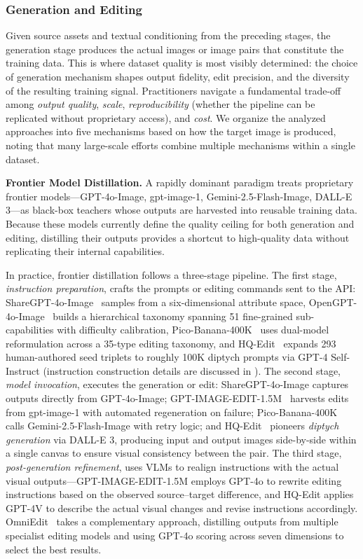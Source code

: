 \documentclass{llmxive}
\begin{document}
\subsubsection{Generation and Editing}
\label{sec:generation}

Given source assets and textual conditioning from the preceding stages, the generation stage produces the actual images or image pairs that constitute the training data. This is where dataset quality is most visibly determined: the choice of generation mechanism shapes output fidelity, edit precision, and the diversity of the resulting training signal. Practitioners navigate a fundamental trade-off among \emph{output quality}, \emph{scale}, \emph{reproducibility} (whether the pipeline can be replicated without proprietary access), and \emph{cost}. We organize the analyzed approaches into five mechanisms based on how the target image is produced, noting that many large-scale efforts combine multiple mechanisms within a single dataset.


\textbf{Frontier Model Distillation.}
A rapidly dominant paradigm treats proprietary frontier models---GPT-4o-Image, gpt-image-1, Gemini-2.5-Flash-Image, DALL-E 3---as black-box teachers whose outputs are harvested into reusable training data. Because these models currently define the quality ceiling for both generation and editing, distilling their outputs provides a shortcut to high-quality data without replicating their internal capabilities.

In practice, frontier distillation follows a three-stage pipeline. The first stage, \emph{instruction preparation}, crafts the prompts or editing commands sent to the API: ShareGPT-4o-Image~\citep{chen2025sharegpt} samples from a six-dimensional attribute space, OpenGPT-4o-Image~\citep{chen2025opengpt} builds a hierarchical taxonomy spanning 51 fine-grained sub-capabilities with difficulty calibration, Pico-Banana-400K~\citep{qian2025pico} uses dual-model reformulation across a 35-type editing taxonomy, and HQ-Edit~\citep{hui2024hq} expands 293 human-authored seed triplets to roughly 100K diptych prompts via GPT-4 Self-Instruct (instruction construction details are discussed in ). The second stage, \emph{model invocation}, executes the generation or edit: ShareGPT-4o-Image captures outputs directly from GPT-4o-Image; GPT-IMAGE-EDIT-1.5M~\citep{wang2025gpt} harvests edits from gpt-image-1 with automated regeneration on failure; Pico-Banana-400K calls Gemini-2.5-Flash-Image with retry logic; and HQ-Edit~\citep{hui2024hq} pioneers \emph{diptych generation} via DALL-E 3, producing input and output images side-by-side within a single canvas to ensure visual consistency between the pair. The third stage, \emph{post-generation refinement}, uses VLMs to realign instructions with the actual visual outputs---GPT-IMAGE-EDIT-1.5M employs GPT-4o to rewrite editing instructions based on the observed source--target difference, and HQ-Edit applies GPT-4V to describe the actual visual changes and revise instructions accordingly. OmniEdit~\citep{wei2024omniedit} takes a complementary approach, distilling outputs from multiple specialist editing models and using GPT-4o scoring across seven dimensions to select the best results.
\end{document}
